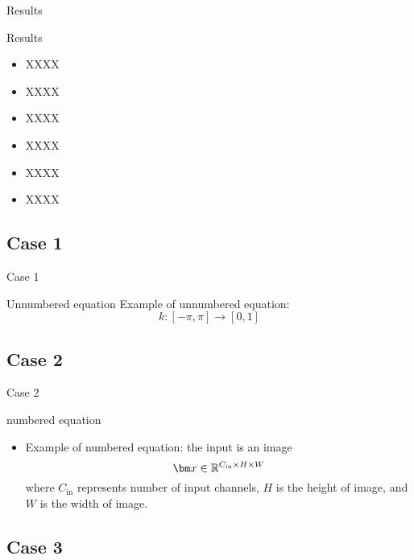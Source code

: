 \begin{frame}{Results}
  \begin{block}{Results}
    \begin{itemize}
      \setlength{\itemsep}{6pt}
      \item XXXX
      \item XXXX
      \item XXXX
      \item XXXX
      \item XXXX
      \item XXXX
    \end{itemize}
  \end{block}
\end{frame}

\subsection{Case 1}

\begin{frame}{Case 1}
  \begin{block}{Unnumbered equation}
    Example of unnumbered equation:
    $$
      k:[-\pi,\pi] \rightarrow [0,1]
    $$
  \end{block}
\end{frame}

\subsection{Case 2}

\begin{frame}{Case 2}
  \begin{block}{numbered equation}
    \begin{itemize}
      \item Example of numbered equation: the input is an image
      \begin{equation}
        \vx\in\reals^{C_{\text{in}}\times H\times W}
      \end{equation}
      where $C_{\text{in}}$ represents number of input channels, $H$ is the height of image, and $W$ is the width of image.
    \end{itemize}
  \end{block}
\end{frame}

\subsection{Case 3}

